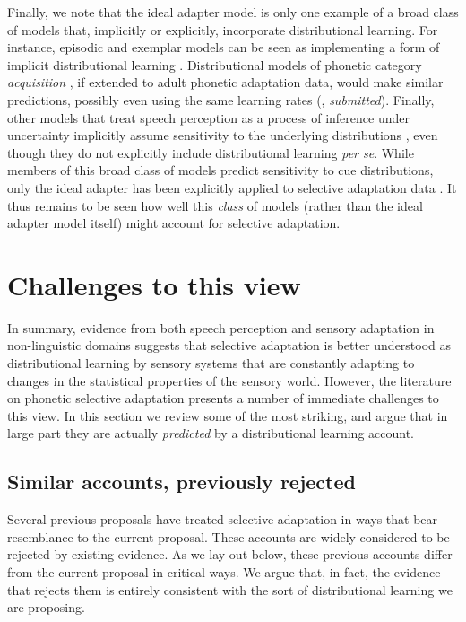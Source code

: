 \label{r2-broader-class-of-models}
Finally, we note that the ideal adapter model is only one example of a broad class of models that, implicitly or explicitly, incorporate distributional learning.  For instance, episodic and exemplar models \autocite[e.g.,][]{Goldinger1998,Johnson1997a} can be seen as implementing a form of implicit distributional learning \autocites[as kernel density estimation, cf.][]{Sanborn2010}[or importance sampling][]{Shi2010}.  Distributional models of phonetic category \emph{acquisition} \autocite[e.g.,][]{Feldman2013a,McMurray2009,Vallabha2007}, if extended to adult phonetic adaptation data, would make similar predictions, possibly even using the same learning rates (\citeauthor{ToscanoSubmitted}, \emph{submitted}).  Finally, other models that treat speech perception as a process of inference under uncertainty implicitly assume sensitivity to the underlying distributions \autocite{Clayards2008,Feldman2009a,Norris2008,Sonderegger2010}, even though they do not explicitly include distributional learning \emph{per se}.  While members of this broad class of models predict sensitivity to cue distributions, only the ideal adapter has been explicitly applied to selective adaptation data \autocite{Kleinschmidt2015}.  It thus remains to be seen how well this \emph{class} of models (rather than the ideal adapter model itself) might account for selective adaptation.


\section{Challenges to this view}
\label{sec:challenges-this-view}

In summary, evidence from both speech perception and sensory adaptation in non-linguistic domains suggests that selective adaptation is better understood as distributional learning by sensory systems that are constantly adapting to changes in the statistical properties of the sensory world.  However, the literature on phonetic selective adaptation presents a number of immediate challenges to this view.  In this section we review some of the most striking, and argue that in large part they are actually \emph{predicted} by a distributional learning account.

\subsection{Similar accounts, previously rejected}
\label{sec:simil-acco-prev}

Several previous proposals have treated selective adaptation in ways that bear resemblance to the current proposal.  These accounts are widely considered to be rejected by existing evidence.  As we lay out below, these previous accounts differ from the current proposal in critical ways.  We argue that, in fact, the evidence that rejects them is entirely consistent with the sort of distributional learning we are proposing.

